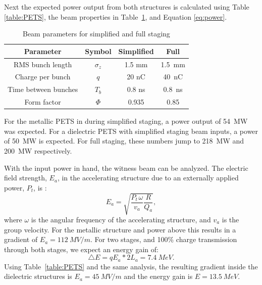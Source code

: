 Next the expected power output from both structures is calculated using Table \ref{table:PETS}, 
the beam properties in Table~\ref{table:beam1}, and Equation \ref{eq:power}. 
\begin{table}
	\begin{center}
		\caption{Beam parameters for simplified and full staging}
		\label{table:beam1}
		\begin{tabular}{cccc}  
			\toprule
			\toprule
			\textbf{Parameter} & \textbf{Symbol} & \textbf{Simplified} & \textbf{Full} \\
			\midrule
			RMS bunch length & $\sigma_{z}$ & 1.5 mm & \SI{1.5}{mm}\\  
			Charge per bunch & $q$ & 20 nC & \SI{40}{nC}\\  
			Time between bunches & $T_{b}$ & 0.8 ns & \SI{0.8}{ns}\\  
			Form factor 		 & $\Phi$ & 0.935 & \SI{0.85}{}\\  
			\bottomrule
		\end{tabular}
	\end{center}
\end{table}
For the metallic PETS in during simplified staging, a power output of \SI{54}{MW} was expected.
For a dielectric PETS with simplified staging beam inputs, a power of \SI{50}{MW} is expected.
For full staging, these numbers jump to \SI{218}{MW} and \SI{200}{MW} respectively. 

With the input power in hand, the witness beam can be analyzed. 
The electric field strength, $E_{a}$, in 
the accelerating structure due to an externally applied power,
$P_{t}$, is \cite{wangler}: 
\begin{equation}
	E_{a}=\sqrt{\frac{P_{t\,}\omega}{v_{a}}\frac{R}{Q_a}},
\label{eq:electricfield}
\end{equation}
where $\omega$ is the angular frequency of the accelerating structure,
and $v_{a}$ is the group velocity. 
  For the metallic structure and power above this results in a gradient of $E_a=\SI{112}{MV/m}$.
For two stages, and 100\% charge transmission through both stages,
we expect an energy gain of: 
\begin{equation}
\triangle E=qE_a*2L_{a}=\SI{7.4}{MeV}.
\end{equation}
Using Table~\ref{table:PETS} and the same analysis, 
the resulting gradient inside the dielectric structures is
$E_a=\SI{45}{MV/m}$ and the energy gain is $E = \SI{13.5}{MeV}$.


